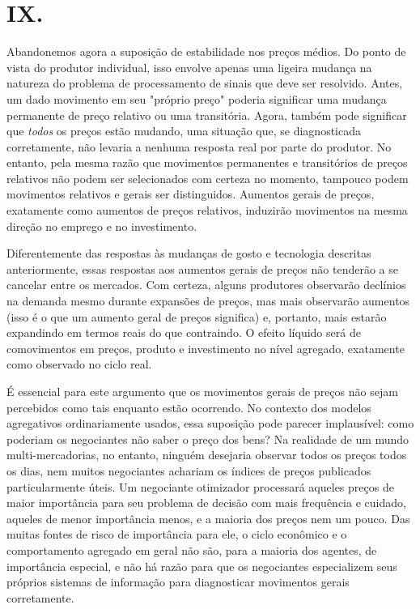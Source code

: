 \documentclass[12pt]{article}
\begin{document}
\section*{IX.}

Abandonemos agora a suposição de estabilidade nos preços médios. Do ponto de vista do produtor individual, isso envolve apenas uma ligeira mudança na natureza do problema de processamento de sinais que deve ser resolvido. Antes, um dado movimento em seu "próprio preço" poderia significar uma mudança permanente de preço relativo ou uma transitória. Agora, também pode significar que \textit{todos} os preços estão mudando, uma situação que, se diagnosticada corretamente, não levaria a nenhuma resposta real por parte do produtor. No entanto, pela mesma razão que movimentos permanentes e transitórios de preços relativos não podem ser selecionados com certeza no momento, tampouco podem movimentos relativos e gerais ser distinguidos. Aumentos gerais de preços, exatamente como aumentos de preços relativos, induzirão movimentos na mesma direção no emprego e no investimento.

Diferentemente das respostas às mudanças de gosto e tecnologia descritas anteriormente, essas respostas aos aumentos gerais de preços não tenderão a se cancelar entre os mercados. Com certeza, alguns produtores observarão declínios na demanda mesmo durante expansões de preços, mas mais observarão aumentos (isso é o que um aumento geral de preços significa) e, portanto, mais estarão expandindo em termos reais do que contraindo. O efeito líquido será de comovimentos em preços, produto e investimento no nível agregado, exatamente como observado no ciclo real.

É essencial para este argumento que os movimentos gerais de preços não sejam percebidos como tais enquanto estão ocorrendo. No contexto dos modelos agregativos ordinariamente usados, essa suposição pode parecer implausível: como poderiam os negociantes não saber o preço dos bens? Na realidade de um mundo multi-mercadorias, no entanto, ninguém desejaria observar todos os preços todos os dias, nem muitos negociantes achariam os índices de preços publicados particularmente úteis. Um negociante otimizador processará aqueles preços de maior importância para seu problema de decisão com mais frequência e cuidado, aqueles de menor importância menos, e a maioria dos preços nem um pouco. Das muitas fontes de risco de importância para ele, o ciclo econômico e o comportamento agregado em geral não são, para a maioria dos agentes, de importância especial, e não há razão para que os negociantes especializem seus próprios sistemas de informação para diagnosticar movimentos gerais corretamente.
\end{document}
